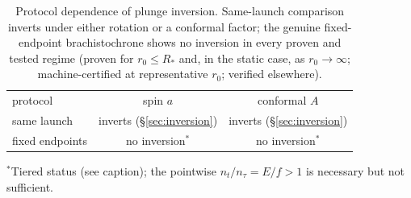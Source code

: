 \documentclass[
    aps, prd, twocolumn, superscriptaddress,
    showpacs, nofootinbib, floatfix
]{revtex4-2}
\begin{document}
\begin{table}[t]
    \centering
    \caption{Protocol dependence of plunge inversion. Same-launch
    comparison inverts under either rotation or a conformal factor; the
    genuine fixed-endpoint brachistochrone shows no inversion in every proven
    and tested regime (proven for $r_0\le R_\ast$ and, in the static case, as
    $r_0\to\infty$; machine-certified at representative $r_0$; verified elsewhere).}
    \label{tab:protocol}
    \begin{ruledtabular}
    \begin{tabular}{lcc}
        protocol & spin $a$ & conformal $A$ \\
        \colrule
        same launch & inverts (\S\ref{sec:inversion}) & inverts (\S\ref{sec:inversion}) \\
        fixed endpoints & no inversion$^\ast$ & no inversion$^\ast$ \\
    \end{tabular}
    \end{ruledtabular}
    \footnotesize $^\ast$Tiered status (see caption); the pointwise
    $n_t/n_\tau=E/f>1$ is necessary but not sufficient.
\end{table}
\end{document}
